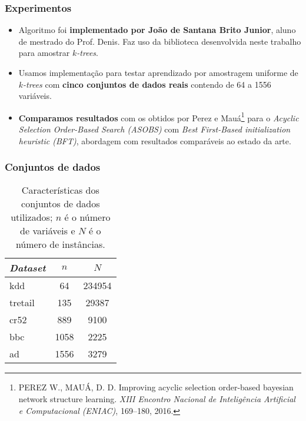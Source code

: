 \documentclass{beamer}
\begin{document}
  \begin{frame}
    \frametitle{Experimentos}

    \begin{itemize}
      \item Algoritmo foi \textbf{implementado por João de Santana Brito Junior}, aluno de mestrado do Prof. Denis. Faz uso da biblioteca desenvolvida neste trabalho para amostrar \emph{$k$-trees}.
      \item Usamos implementação para testar aprendizado por amostragem uniforme de \emph{$k$-trees} com \textbf{cinco conjuntos de dados reais} contendo de 64 a 1556 variáveis.
      \item \textbf{Comparamos resultados} com os obtidos por Perez e Mauá\footnote{\scriptsize PEREZ W., MAUÁ, D. D. Improving acyclic selection order-based bayesian network structure learning. \emph{XIII Encontro Nacional de Inteligência Artificial e Computacional (ENIAC)}, 169--180, 2016.} para o \emph{Acyclic Selection Order-Based Search (ASOBS)} com \emph{Best First-Based initialization heuristic (BFT)}, abordagem com resultados comparáveis ao estado da arte.
    \end{itemize}
  \end{frame}

  \begin{frame}
    \frametitle{Conjuntos de dados}

    \begin{table}
      \centering
      \begin{tabular}{l c c} \hline
        \emph{Dataset} & $n$ & $N$ \\ \hline
        kdd & 64 & 234954 \\
        tretail & 135 & 29387 \\
        cr52 & 889 & 9100 \\
        bbc & 1058 & 2225 \\
        ad & 1556 & 3279 \\ \hline
      \end{tabular}

      \caption{Características dos conjuntos de dados utilizados; $n$ é o número de variáveis e $N$ é o número de instâncias.}
      \label{tab:conjuntos}
    \end{table}
  \end{frame}
\end{document}
